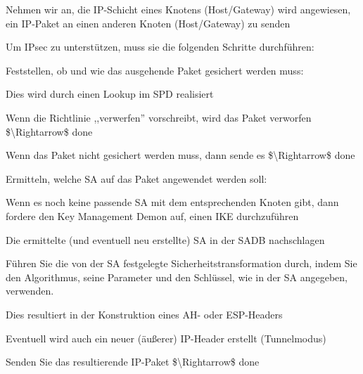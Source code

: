 \documentclass[a4paper]{article}
\begin{document}
\begin{multicols}{3}
      \begin{itemize*}
            \item Nehmen wir an, die IP-Schicht eines Knotens (Host/Gateway) wird
            angewiesen, ein IP-Paket an einen anderen Knoten (Host/Gateway) zu
            senden
            \item Um IPsec zu unterstützen, muss sie die folgenden Schritte durchführen:
            \begin{itemize*}
                  \item Feststellen, ob und wie das ausgehende Paket gesichert werden muss:
                  \begin{itemize*}
                        \item Dies wird durch einen Lookup im SPD realisiert
                        \item Wenn die Richtlinie ,,verwerfen'' vorschreibt, wird das Paket verworfen \$\textbackslash Rightarrow\$ done
                        \item Wenn das Paket nicht gesichert werden muss, dann sende es \$\textbackslash Rightarrow\$ done
                  \end{itemize*}
                  \item Ermitteln, welche SA auf das Paket angewendet werden soll:
                  \begin{itemize*} \item Wenn es noch keine passende SA mit dem entsprechenden Knoten gibt, dann fordere den Key Management Demon auf, einen IKE durchzuführen \end{itemize*}
                  \item Die ermittelte (und eventuell neu erstellte) SA in der SADB nachschlagen
                  \item Führen Sie die von der SA festgelegte Sicherheitstransformation durch, indem Sie den Algorithmus, seine Parameter und den Schlüssel, wie in der SA angegeben, verwenden.
                  \begin{itemize*}
                        \item Dies resultiert in der Konstruktion eines AH- oder ESP-Headers
                        \item Eventuell wird auch ein neuer (äußerer) IP-Header erstellt (Tunnelmodus)
                  \end{itemize*}
                  \item Senden Sie das resultierende IP-Paket \$\textbackslash Rightarrow\$ done
            \end{itemize*}
      \end{itemize*}



\end{multicols}
\end{document}
